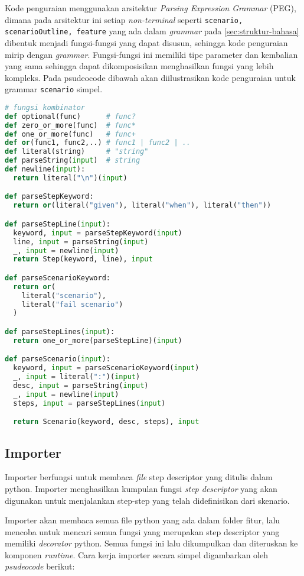 Kode penguraian menggunakan arsitektur \emph{Parsing Expression Grammar} (PEG), dimana
pada arsitektur ini setiap \emph{non-terminal} seperti \texttt{scenario, scenarioOutline, feature}
yang ada dalam \emph{grammar} pada \ref{sec:struktur-bahasa} dibentuk menjadi fungsi-fungsi
yang dapat disusun, sehingga kode penguraian mirip dengan \emph{grammar}. Fungsi-fungsi
ini memiliki tipe parameter dan kembalian yang sama sehingga
dapat dikomposisikan menghasilkan fungsi yang lebih kompleks. Pada psudeocode dibawah
akan diilustrasikan kode penguraian untuk grammar \texttt{scenario} simpel.

\begin{lstlisting}[language=python]
# fungsi kombinator
def optional(func)      # func?
def zero_or_more(func)  # func*
def one_or_more(func)   # func+
def or(func1, func2,..) # func1 | func2 | ..
def literal(string)     # "string"
def parseString(input)  # string
def newline(input):
  return literal("\n")(input)

def parseStepKeyword:
  return or(literal("given"), literal("when"), literal("then"))

def parseStepLine(input):
  keyword, input = parseStepKeyword(input)
  line, input = parseString(input)
  _, input = newline(input)
  return Step(keyword, line), input

def parseScenarioKeyword:
  return or(
    literal("scenario"),
    literal("fail scenario")
  )

def parseStepLines(input):
  return one_or_more(parseStepLine)(input)

def parseScenario(input):
  keyword, input = parseScenarioKeyword(input)
  _, input = literal(":")(input)
  desc, input = parseString(input)
  _, input = newline(input)
  steps, input = parseStepLines(input)

  return Scenario(keyword, desc, steps), input
\end{lstlisting}


\subsection{Importer}

Importer berfungsi untuk membaca \emph{file} step descriptor yang ditulis dalam python.
Importer menghasilkan kumpulan fungsi \emph{step descriptor} yang akan digunakan untuk
menjalankan step-step yang telah didefinisikan dari skenario.

Importer akan membaca semua file python yang ada dalam folder fitur, lalu mencoba untuk
mencari semua fungsi yang merupakan step descriptor yang memiliki \emph{decorator} python.
Semua fungsi ini lalu dikumpulkan dan diteruskan ke komponen \emph{runtime}.
Cara kerja importer secara simpel digambarkan oleh \emph{psudeocode} berikut:


